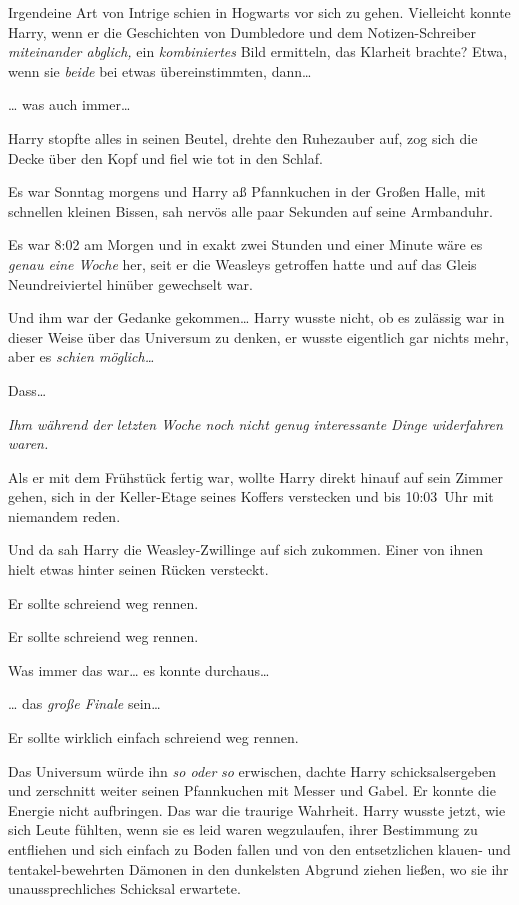 {Irgendeine Art von Intrige schien in Hogwarts vor sich zu gehen. Vielleicht konnte Harry, wenn er die Geschichten von Dumbledore und dem Notizen-Schreiber \emph{miteinander abglich,} ein \emph{kombiniertes} Bild ermitteln, das Klarheit brachte? Etwa, wenn sie \emph{beide} bei etwas übereinstimmten, dann…

… was auch immer…

Harry stopfte alles in seinen Beutel, drehte den Ruhezauber auf, zog sich die Decke über den Kopf und fiel wie tot in den Schlaf.

\later

Es war Sonntag morgens und Harry aß Pfannkuchen in der Großen Halle, mit schnellen kleinen Bissen, sah nervös alle paar Sekunden auf seine Armbanduhr.

Es war 8:02 am Morgen und in exakt zwei Stunden und einer Minute wäre es \emph{genau eine Woche} her, seit er die Weasleys getroffen hatte und auf das Gleis Neundreiviertel hinüber gewechselt war.

Und ihm war der Gedanke gekommen… Harry wusste nicht, ob es zulässig war in dieser Weise über das Universum zu denken, er wusste eigentlich gar nichts mehr, aber es \emph{schien möglich…}

Dass…

\emph{Ihm während der letzten Woche noch nicht genug interessante Dinge widerfahren waren.}

Als er mit dem Frühstück fertig war, wollte Harry direkt hinauf auf sein Zimmer gehen, sich in der Keller-Etage seines Koffers verstecken und bis 10:03~Uhr mit niemandem reden.

Und da sah Harry die Weasley-Zwillinge auf sich zukommen. Einer von ihnen hielt etwas hinter seinen Rücken versteckt.

Er sollte schreiend weg rennen.

Er sollte schreiend weg rennen.

Was immer das war… es konnte durchaus…

… das \emph{große Finale} sein…

Er sollte wirklich einfach schreiend weg rennen.

Das Universum würde ihn \emph{so oder} \emph{so} erwischen, dachte Harry schicksalsergeben und zerschnitt weiter seinen Pfannkuchen mit Messer und Gabel. Er konnte die Energie nicht aufbringen. Das war die traurige Wahrheit. Harry wusste jetzt, wie sich Leute fühlten, wenn sie es leid waren wegzulaufen, ihrer Bestimmung zu entfliehen und sich einfach zu Boden fallen und von den entsetzlichen klauen- und tentakel-bewehrten Dämonen in den dunkelsten Abgrund ziehen ließen, wo sie ihr unaussprechliches Schicksal erwartete.

}
